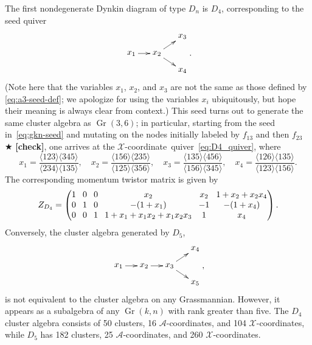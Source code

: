 \documentclass[12pt]{article}
\DeclareMathOperator{\Gr}{Gr}
\def\ket#1{\langle #1 \rangle}
\def\xcoord{$\mathcal{X}$-coordinate}
\def\xcoords{$\mathcal{X}$-coordinates}
\def\acoords{$\mathcal{A}$-coordinates}
\def\draftnote#1{{\color{red} $\bigstar$ }{\bf [#1]}}
\begin{document}
The first nondegenerate Dynkin diagram of type $D_n$ is $D_4$, corresponding to the seed quiver
\begin{equation} \label{eq:D4_quiver}
    \begin{gathered}
    \begin{xy} 0;<1pt,0pt>:<0pt,-1pt>::
      (0,20) *+{x_1} ="1",
      (30,20) *+{x_2} ="2",
      (60,0) *+{x_3} ="3",
      (60,40) *+{x_4} ="4",
      "1", {\ar"2"},
      "2", {\ar"3"},
      "2", {\ar"4"},
    \end{xy}
    \end{gathered} .
\end{equation}
(Note here that the variables $x_1$, $x_2$, and $x_3$ are not the same as those defined by \eqref{eq:a3-seed-def}; we apologize for using the variables $x_i$ ubiquitously, but hope their meaning is always clear from context.) This seed turns out to generate the same cluster algebra as $\Gr(3,6)$; in particular, starting from the seed in~\eqref{eq:gkn-seed} and mutating on the nodes initially labeled by $f_{13}$ and then $f_{23}$\draftnote{check}, one arrives at the \xcoord\ quiver~\eqref{eq:D4_quiver}, where
\begin{equation}\label{eq:d4-seed-def}
x_1 = \frac{\ket{123}\ket{345}}{\ket{234}\ket{135}}, \quad x_2 = \frac{\ket{156}\ket{235}}{\ket{125}\ket{356}}, \quad x_3 = \frac{\ket{135}\ket{456}}{\ket{156}\ket{345}}, \quad x_4 = \frac{\ket{126}\ket{135}}{\ket{123}\ket{156}}.
\end{equation}
The corresponding momentum twistor matrix is given by
\begin{equation}
Z_{D_4} = 
\begingroup
\setlength\arraycolsep{4pt}
\begin{pmatrix} 
 1 & 0 & 0 & x_2 & x_2 & 1+x_2+x_2 x_4 \\
 0 & 1 & 0 & -(1+x_1) & -1 & - (1+x_4) \\
 0 & 0 & 1 & 1 + x_1 + x_1 x_2 + x_1 x_2 x_3 & 1 & x_4
 \end{pmatrix}
\endgroup .
\end{equation}
Conversely, the cluster algebra generated by $D_5$,
\begin{equation}\label{def:D5}
    \begin{gathered}
    \begin{xy} 0;<1pt,0pt>:<0pt,-1pt>::
      (0,20) *+{x_1} ="1",
      (30,20) *+{x_2} ="2",
      (60,20) *+{x_3} ="3",
      (90,0) *+{x_4} ="4",
      (90,40) *+{x_5} ="5",
      "1", {\ar"2"},
      "2", {\ar"3"},
      "3", {\ar"4"},
      "3", {\ar"5"},
    \end{xy}
    \end{gathered} ,
\end{equation}
is not equivalent to the cluster algebra on any Grassmannian. However, it appears as a subalgebra of any $\Gr(k,n)$ with rank greater than five. The $D_4$ cluster algebra consists of 50 clusters, 16 \acoords, and 104 \xcoords, while $D_5$ has 182 clusters, 25 \acoords, and 260 \xcoords. 
\end{document}
